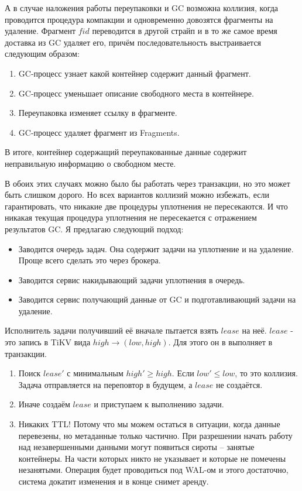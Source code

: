 \documentclass[a4paper,12pt]{article}
\begin{document}
А в случае наложения работы переупаковки и GC возможна коллизия, когда проводится процедура компакции и одновременно довозятся фрагменты на
удаление. Фрагмент $fid$ переводится в другой страйп и в то же самое время доставка из GC удаляет его, причём
последовательность выстраивается следующим образом:
\begin{enumerate}
\item GC-процесс узнает какой контейнер содержит данный фрагмент.
\item GC-процесс уменьшает описание свободного места в контейнере.
\item Переупаковка изменяет ссылку в фрагменте.
\item GC-процесс удаляет фрагмент из Fragments.
\end{enumerate}
В итоге, контейнер содержащий переупакованные данные содержит неправильную информацию о свободном месте.

В обоих этих случаях можно было бы работать через транзакции, но это может быть слишком дорого. Но всех вариантов коллизий можно избежать,
если гарантировать, что никакие две процедуры уплотнения не пересекаются. И что никакая текущая процедура уплотнения не пересекается с отражением
результатов GC. Я предлагаю следующий подход:

\begin{itemize}
\item Заводится очередь задач. Она содержит задачи на уплотнение и на удаление. Проще всего сделать это через брокера.
\item Заводится сервис накидывающий задачи уплотнения в очередь.
\item Заводится сервис получающий данные от GC и подготавливающий задачи на удаление.
\end{itemize}

Исполнитель задачи получивший её вначале пытается взять $lease$ на неё. $lease$ - это запись в TiKV вида $high \rightarrow (low, high)$. Для этого он в выполняет
в транзакции.

\begin{enumerate}
\item Поиск $lease'$ с минимальным $high' \geqslant high$. Если $low' \leqslant low$, то это коллизия. Задача отправляется на переповтор в будущем, а $lease$ не создаётся.
\item Иначе создаём $lease$ и приступаем к выполнению задачи.
\item Никаких TTL! Потому что мы можем остаться в ситуации, когда данные перевезены, но метаданные только частично. При разрешении начать работу над незавершенными
данными могут появиться сироты – занятые контейнеры. На части которых никто не указывает и которые не помечены незанятыми. Операция будет проводиться под WAL-ом и этого достаточно,
система докатит изменения и в конце снимет аренду.
\end{enumerate}
\end{document}
